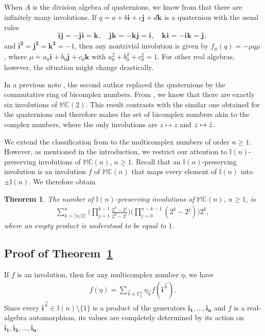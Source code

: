 \documentclass[12pt]{amsart}
\theoremstyle{plain}
\newtheorem{theorem}{Theorem}[section]
\theoremstyle{definition}
\numberwithin{equation}{section}
\newcommand{\im}[1]{\mathbf{ i_{#1}}}
\newcommand{\ims}[1]{\mathbf{ i_{#1}^2}}
\newcommand{\jm}[1]{\mathbf{ j_{#1}}}
\newcommand{\jms}[1]{\mathbf{ j_{#1}^2}}
\newcommand{\km}[1]{\mathbf{k_{#1}}}
\newcommand{\kms}[1]{\mathbf{k_{#1}^2}}
\newcommand{\mC}{\mathbb{C}}
\newcommand{\mM}{\mathbb{M}}
\newcommand{\mI}{\mathbb{I}}
\begin{document}
When $A$ is the division algebra of quaternions, we know from \cite{SangwineTodd2007, Lawson2021} that there are infinitely many involutions. If $q = a + b \im{} + c \jm{} + d \km{}$ is a quaternion with the usual rules
    \[
        \im{} \jm{} = -\jm{} \im{} = \km{} , \quad \jm{} \km{} = -\km{} \jm{} = \im{} , \quad \km{} \im{} = -\im{} \km{} = \jm{},
    \]
and $\ims{} = \jms{} = \kms{} = -1$, then any nontrivial involution is given by $f_{\mu} (q) = -\mu q \mu$, where $\mu = a_0 \im{} + b_0 \jm{} + c_0 \km{}$ with $a_0^2 + b_0^2 + c_0^2 = 1$. For other real algebras, however, the situation might change drastically.

In a previous note \cite{Parise}, the second author replaced the quaternions by the commutative ring of bicomplex numbers. From \cite[Theorem 1]{Parise}, we know that there are exactly six involutions of $\mM \mC(2)$. This result contrasts with the similar one obtained for the quaternions and therefore makes the set of bicomplex numbers akin to the complex numbers, where the only involutions are $z \mapsto z$ and $z \mapsto \Bar{z}$.

We extend the classification from \cite{Parise} to the multicomplex numbers of order $n \geq 1$. However, as mentioned in the introduction, we restrict our attention to $\mI(n)$-preserving involutions of $\mM \mC(n)$, $n \geq 1$. Recall that an $\mI(n)$-preserving involution is an involution $f$ of $\mM \mC(n)$ that maps every element of $\mI(n)$ into $\pm\mI(n)$. We therefore obtain
    \begin{theorem}\label{T:InvolutionsPreservingBasisUnits}
    The number of $\mI(n)$-preserving involutions of $\mM \mC(n)$, $n \geq 1$, is
        \begin{align*}
            \sum_{k=\lceil n/2\rceil}^{n}  \Big( \prod_{j = 1}^{k-1} \frac{2^n - 2^j}{2^k - 2^j} \Big) \Big( \prod_{j = 0}^{n-k-1} (2^k - 2^j) \Big) 2^k,
        \end{align*}
    where an empty product is understood to be equal to $1$.
    \end{theorem}

\subsection{Proof of Theorem~\ref{T:InvolutionsPreservingBasisUnits}}
If $f$ is an involution, then for any multicomplex number $\eta$, we have
        \begin{align*}
        f ( \eta ) = \sum_{\vec{b} \in \mathbb{F}_2^n} \eta_{\vec{b}} f (\im{}^{\vec{b}}).
        \end{align*}
    Since every $\im{}^{\vec{b}}\in\mI(n)\setminus\{1\}$ is a product of the generators $\im{1},\ldots,\im{n}$ and $f$ is a real-algebra automorphism, its values are completely determined by its action on $\im{1} , \im{2} , \ldots , \im{n}$.
        
\end{document}
